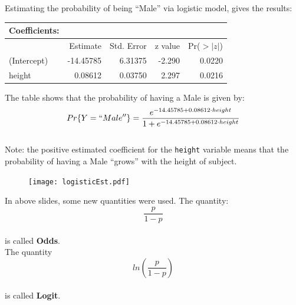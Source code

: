 \begin{frame}
  \vspace{.25cm}
  Estimating the probability of being ``Male'' via logistic model, gives the results:\\
  \begin{center}
    \begin{tabular}{lrrrr}
      Coefficients: &&&&\\
      \hline
      & Estimate & Std. Error &z value & Pr($>|z|$) \\
      \hline
      (Intercept) & -14.45785 & 6.31375  & -2.290  & 0.0220 \\
      height       & 0.08612   & 0.03750  & 2.297   & 0.0216 \\
      \hline
    \end{tabular}
  \end{center}
  The table shows that the probability of having a Male is given by:
  $$Pr\{Y=``Male''\}=\dfrac{e^{-14.45785+0.08612 \cdot height}}{1+e^{-14.45785+0.08612 \cdot height}}$$\\
  Note: the positive estimated coefficient for the \texttt{height} variable means that the probability of having a Male ``grows'' with the height of subject.
\end{frame}

\begin{frame}
  \begin{figure}
    \centering
    \texttt{[image: logisticEst.pdf]}
  \end{figure}
\end{frame}

\begin{frame}
  \vspace{.25cm}
  In above slides, some new quantities were used. The quantity:\\
  $$\dfrac{p}{1-p}$$\\
  is called \textbf{Odds}.\\
  \vspace{.75cm}
  The quantity\\
  $$ln\left(\dfrac{p}{1-p}\right)$$\\
  is called \textbf{Logit}.
\end{frame}


